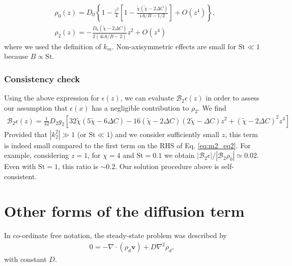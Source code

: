 \documentclass[12pt]{article} %
\begin{document}
\begin{align}
&\rho_0(z) =D_0\left\{1 -
  \frac{z^2}{4}\left[1-\frac{\tilde{\chi}\left(\tilde{\chi} - 2\Delta C\right)}{\mathrm{i}A/B - 1/2}\right]
+ O(z^4)\right\},\\
&\rho_2(z) =-\frac{D_0\left(\tilde{\chi} - 2\Delta C\right)}{2\left(4\mathrm{i}A/B - 2\right)}z^2+O(z^4)
\end{align}
where we used the definition of $k_m$. Non-axisymmetric effects are small for $\mathrm{St}\ll1$ because $B\propto \mathrm{St}$. 

\subsubsection{Consistency check}
Using the above expression for $\epsilon(z)$, we can evaluate
$\mathcal{B}_2\epsilon(z)$ in order to assess our assumption that
$\epsilon(x)$ has a negligible contribution to $\rho_2$. We find
\begin{align}
\mathcal{B}_2\epsilon(z) = \frac{1}{32}D_2g_2
\left[32\tilde{\chi}(5\tilde{\chi} - 6\Delta C) - 16(\tilde{\chi}-2\Delta C)(2\tilde{\chi}-\Delta C)z^2
+(\tilde{\chi} - 2\Delta C)^2z^4\right]
\end{align}
Provided that $|k_2^2|\gg1$ (or $\mathrm{St}\ll 1$) and we consider sufficiently small $z$,  
this term is indeed small compared to the  first term on the RHS of Eq. \ref{eq:m2_eq2}.  For example, considering $z=1$, 
for $\chi=4$ and $\mathrm{St}=0.1$ we obtain $|\mathcal{B}_2\epsilon|/|\mathcal{B}_2\rho_0|\simeq0.02$. 
Even with $\mathrm{St}=1$, this ratio is $\sim0.2$.  
Our solution procedure above is self-consistent.  


\section{Other forms of the diffusion term}
In co-ordinate free notation, the steady-state problem was described by
\begin{align}
0 = -\nabla\cdot(\rho_d\bm{v}) + D\nabla^2\rho_d,
\end{align}
with constant $D$. 
\end{document}

